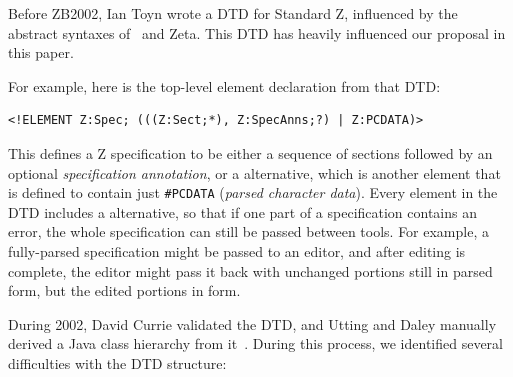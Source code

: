 \documentclass{llncs}  %
\newcommand{\Zeta}{Zeta}
\begin{document}
Before ZB2002, Ian Toyn wrote a DTD for Standard Z, influenced by the
abstract syntaxes of \CADiZ\ and \Zeta.  This DTD has heavily influenced our
proposal in this paper. 

For example, here is the top-level element declaration from that DTD:
\begin{small}
\begin{verbatim}
<!ELEMENT Z:Spec; (((Z:Sect;*), Z:SpecAnns;?) | Z:PCDATA)>
\end{verbatim}
\end{small}

This defines a Z specification to be either a sequence of sections
followed by an optional \emph{specification annotation}, or a
 alternative, which is another element that is defined 
to contain just \verb!#PCDATA! (\textit{parsed character data}).
Every element in the DTD includes a  alternative, so
that if one part of a specification contains an error, the whole
specification can still be passed between tools.  For example,
a fully-parsed specification might be passed to an editor, and after
editing is complete, the editor might pass it back with unchanged
portions still in parsed form, but the edited portions in 
form. 

During 2002, David Currie validated the DTD, and Utting and Daley
manually derived a Java class hierarchy from it~\cite{daley:report02}.
During this process, we identified several difficulties with the
DTD structure:
\end{document}
